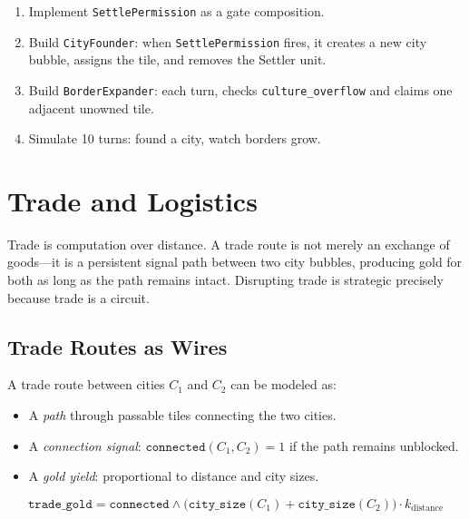 \documentclass[11pt,a4paper,openany]{book}
\theoremstyle{plain}
\theoremstyle{definition}
\theoremstyle{remark}
\newenvironment{background}{%
  \begin{mdframed}[
    linecolor=sphereblue!40, backgroundcolor=sphereblue!5,
    linewidth=1pt, innertopmargin=8pt, innerbottommargin=8pt,
    innerleftmargin=10pt, innerrightmargin=10pt,
    skipabove=10pt, skipbelow=6pt
  ]%
  \setlength{\parindent}{0pt}%
  \noindent{\textcolor{sphereblue}{\textbf{Background}}}\par\smallskip\ignorespaces
}{\end{mdframed}}
\newenvironment{project}[1]{%
  \begin{tcolorbox}[
    title={\textbf{Project: #1}},
    colback=projectbg,
    colframe=sphereblue,
    fonttitle=\bfseries\color{white},
    coltitle=white,
    attach boxed title to top left={yshift=-2mm, xshift=4mm},
    boxed title style={colback=sphereblue, sharp corners},
    sharp corners,
    breakable,
    before upper={\normalfont\setlength{\parindent}{0pt}\tolerance=9999\hbadness=9999}
  ]
}{\end{tcolorbox}}
\newcommand{\AND}{\ensuremath{\wedge}}
\begin{document}
\begin{project}{Expansion System}
  \begin{enumerate}
    \item Implement \texttt{SettlePermission} as a gate composition.
    \item Build \texttt{CityFounder}: when \texttt{SettlePermission}
          fires, it creates a new city bubble, assigns the tile, and
          removes the Settler unit.
    \item Build \texttt{BorderExpander}: each turn, checks
          \texttt{culture\_overflow} and claims one adjacent unowned tile.
    \item Simulate 10 turns: found a city, watch borders grow.
  \end{enumerate}
\end{project}

\chapter{Trade and Logistics}
\label{ch:trade}

\begin{background}
  Trade is computation over distance. A trade route is not merely an
  exchange of goods---it is a persistent signal path between two city
  bubbles, producing gold for both as long as the path remains intact.
  Disrupting trade is strategic precisely because trade is a circuit.
\end{background}

\section{Trade Routes as Wires}

A trade route between cities $C_1$ and $C_2$ can be modeled as:

\begin{itemize}
  \item A \emph{path} through passable tiles connecting the two cities.
  \item A \emph{connection signal}: $\texttt{connected}(C_1, C_2) = 1$
        if the path remains unblocked.
  \item A \emph{gold yield}: proportional to distance and city sizes.
\end{itemize}

\[
  \texttt{trade\_gold} = \texttt{connected} \AND
  \bigl(\texttt{city\_size}(C_1) + \texttt{city\_size}(C_2)\bigr)
  \cdot k_{\text{distance}}
\]
\end{document}
